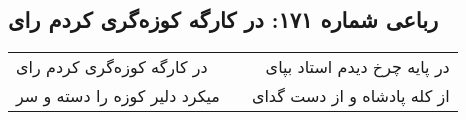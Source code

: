 \begin{center}
\section*{رباعی شماره ۱۷۱: در کارگه کوزه‌گری کردم رای}
\label{sec:sh171}
\begin{longtable}{l p{0.5cm} r}
در کارگه کوزه‌گری کردم رای
&&
در پایه چرخ دیدم استاد بپای
\\
میکرد دلیر کوزه را دسته و سر
&&
از کله پادشاه و از دست گدای
\\
\end{longtable}
\end{center}
